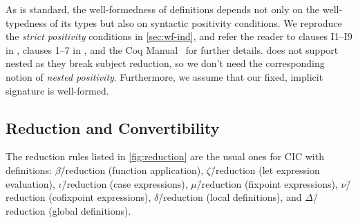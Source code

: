 As is standard, the well-formedness of \coinductive definitions depends not only on the well-typedness of its types but also on syntactic positivity conditions.
We reproduce the \textit{strict positivity} conditions in \autoref{sec:wf-ind}, and refer the reader to clauses I1--I9 in \citet{cic-hat-minus}, clauses 1--7 in \mbox{\citet{cic-hat}}, and the Coq Manual~\citep{coq} for further details.
\lang does not support nested \coinductives as they break subject reduction,
so we don't need the corresponding notion of \textit{nested positivity}.
Furthermore, we assume that our fixed, implicit signature is well-formed.

\iffalse
\subsubsection{Metafunctions and Metarelations}

We declare the following metafunctions, whose definitions are straightforward:

\begin{itemize}
    \item $\FV{\ph}, \SV{\ph}$ return the set of free term and size variables in a given term or environment, respectively;
    \item $\floor{\ph}$ returns the size variable a given finite (\ie not $\infty$) size expression;
    \item $\norm{\ph}$ returns the cardinality of its argument (\eg sequence length, set size, \etc);
    \item $\erase{\ph}$ erases sized terms to bare terms; and
    \item $\erase{\ph}^\upsilon$ replaces size annotations with size variable $\upsilon$ by $*$ and removes all other ones.
\end{itemize}

Note that the free size variables of a size substition $\rho$ are only those of the sizes that $\rho$ maps \emph{to}.
\fi

\subsection{Reduction and Convertibility}

The reduction rules listed in \autoref{fig:reduction} are the usual ones for CIC with definitions:
$\beta$\=/reduction (function application),
$\zeta$\=/reduction (let expression evaluation),
$\iota$\=/reduction (case expressions),
$\mu$\=/reduction (fixpoint expressions),
$\nu$\=/reduction (cofixpoint expressions),
$\delta$\=/reduction (local definitions), and
$\Delta$\=/reduction (global definitions).

